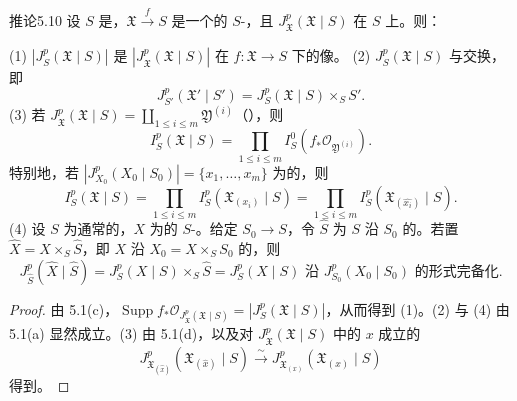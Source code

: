 \begin{SGAresult}{推论}{5.10}
设 $S$ 是，$\mathfrak X\xrightarrow fS$ 是一个的 $S$-，且 $J_{\mathfrak X}^p(\mathfrak X\mid S)$ 在 $S$ 上。则：

(1) $|J_S^p(\mathfrak X\mid S)|$ 是 $|J_{\mathfrak X}^p(\mathfrak X\mid S)|$ 在 $f:\mathfrak X\to S$ 下的像。
(2) $J_S^p(\mathfrak X\mid S)$ 与交换，即
\[
J_{S'}^p(\mathfrak X'\mid S')=J_S^p(\mathfrak X\mid S)\times_S S'.
\]
(3) 若 $J_{\mathfrak X}^p(\mathfrak X\mid S)=\coprod_{1\leq i\leq m}\mathfrak Y^{(i)}$（），则
\[
I_S^p(\mathfrak X\mid S)=\prod_{1\leq i\leq m}I_S^0(f_*\mathcal O_{\mathfrak Y^{(i)}}).
\]
特别地，若 $|J_{X_0}^p(X_0\mid S_0)|=\{x_1,\ldots,x_m\}$ 为的，则
\[
I_S^p(\mathfrak X\mid S)=\prod_{1\leq i\leq m}I_S^p(\mathfrak X_{(x_i)}\mid S)
 =\prod_{1\leq i\leq m}I_S^p(\mathfrak X_{(\widehat{x_i})}\mid S).
\]
(4) 设 $S$ 为通常的，$X$ 为的 $S$-。给定 $S_0\to S$，令 $\widehat S$ 为 $S$ 沿 $S_0$ 的。若置 $\widehat X=X\times_S\widehat S$，即 $X$ 沿 $X_0=X\times_S S_0$ 的，则
\[
J_{\widehat S}^p(\widehat X\mid\widehat S)=J_S^p(X\mid S)\times_S\widehat S
 =J_S^p(X\mid S)\text{ 沿 }J_{S_0}^p(X_0\mid S_0)\text{ 的形式完备化}.
\]
\end{SGAresult}
\begin{proof}
由 5.1(c)，$\operatorname{Supp}f_*\mathcal O_{J_{\mathfrak X}^p(\mathfrak X\mid S)}=|J_S^p(\mathfrak X\mid S)|$，从而得到 (1)。(2) 与 (4) 由 5.1(a) 显然成立。(3) 由 5.1(d)，以及对 $J_{\mathfrak X}^p(\mathfrak X\mid S)$ 中的 $x$ 成立的
\[
J_{\mathfrak X_{(\widehat x)}}^p(\mathfrak X_{(\widehat x)}\mid S)
 \xrightarrow\sim J_{\mathfrak X_{(x)}}^p(\mathfrak X_{(x)}\mid S)
\]
得到。
\end{proof}

